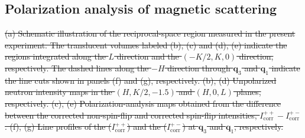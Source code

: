 \documentclass[%
 reprint,
superscriptaddress,
 amsmath,amssymb,
 aps,
floatfix,
]{revtex4-2}
\providecommand{\DIFdeltex}[1]{{\protect\color{red}\sout{#1}}}                      %
\providecommand{\DIFdelbegin}{} %
\providecommand{\DIFdelend}{} %
\providecommand{\DIFdelFL}[1]{\DIFdel{#1}} %
\providecommand{\DIFdel}[1]{\texorpdfstring{\DIFdeltex{#1}}{}} %
\newcommand{\DIFscaledelfig}{0.5}
\newlength{\DIFdelgraphicswidth} %
\newlength{\DIFdelgraphicsheight} %
\newcommand{\DIFdelincludegraphics}[2][]{%
\sbox{\DIFdelgraphicsbox}{\DIFOincludegraphics[#1]{#2}}%
\settoboxwidth{\DIFdelgraphicswidth}{\DIFdelgraphicsbox} %
\settoboxtotalheight{\DIFdelgraphicsheight}{\DIFdelgraphicsbox} %
\scalebox{\DIFscaledelfig}{%
\parbox[b]{\DIFdelgraphicswidth}{\usebox{\DIFdelgraphicsbox}\\[-\baselineskip] \rule{\DIFdelgraphicswidth}{0em}}\llap{\resizebox{\DIFdelgraphicswidth}{\DIFdelgraphicsheight}{%
\setlength{\unitlength}{\DIFdelgraphicswidth}%
\begin{picture}(1,1)%
\thicklines\linethickness{2pt} %
{\color[rgb]{1,0,0}\put(0,0){\framebox(1,1){}}}%
{\color[rgb]{1,0,0}\put(0,0){\line( 1,1){1}}}%
{\color[rgb]{1,0,0}\put(0,1){\line(1,-1){1}}}%
\end{picture}%
}\hspace*{3pt}}} %
} %
\DeclareRobustCommand{\DIFdelbegin}{\DIFOdelbegin \let\includegraphics\DIFdelincludegraphics} %
\DeclareRobustCommand{\DIFdelend}{\DIFOaddend \let\includegraphics\DIFOincludegraphics} %
\begin{document}
\subsection{Polarization analysis of magnetic scattering}
\DIFdelbegin %
{%
\DIFdelFL{(a) Schematic illustration of the reciprocal-space region measured in the present experiment.
The translucent volumes labeled (b), (c) and (d), (e) indicate the regions integrated along the \(L\) direction and the \((-K/2,K,0)\) direction, respectively.
The dashed lines along the \(-H\) direction through \(\boldsymbol{q}_3\) and \(\boldsymbol{q}_1\) indicate the line cuts shown in panels (f) and (g), respectively.
(b), (d) Unpolarized neutron intensity maps in the \((H,K/2,-1.5)\) and \((H,0,L)\) planes, respectively.
(c), (e) Polarization-analysis maps obtained from the difference between the corrected non-spin-flip and corrected spin-flip intensities, \(I^{++}_\mathrm{corr}-I^{+-}_\mathrm{corr}\).
(f), (g) Line profiles of the ($I^{++}_\mathrm{corr}$) and the ($I^{+-}_\mathrm{corr}$) at \(\boldsymbol{q}_3\) and \(\boldsymbol{q}_1\), respectively.
}}
\DIFdelend
\end{document}
